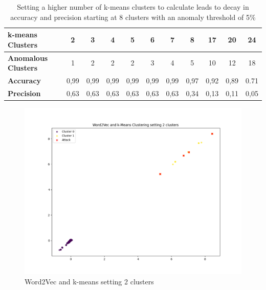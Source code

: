 \begin{table}[H]
	\caption{Setting a higher number of k-means clusters to calculate leads to decay in accuracy and precision starting at 8 clusters with an anomaly threshold of 5\%}
	\label{tab:k-means_clusters}
	\begin{tabular}{|l|c|c|c|c|c|c|c|c|c|c|}
	\hline
	\textbf{k-means Clusters}   & \textbf{2} & \textbf{3} & \textbf{4} & \textbf{5} & \textbf{6} & \textbf{7} & \textbf{8} & \textbf{17} & \textbf{20} & \textbf{24} \\ \hline
	\textbf{Anomalous Clusters} & 1          & 2          & 2          & 2          & 3          & 4          & 5          & 10          & 12          & 18          \\ \hline
	\textbf{Accuracy}           & 0,99       & 0,99       & 0,99       & 0,99       & 0,99       & 0,99       & 0,97       & 0,92        & 0,89        & 0.71        \\ \hline
	\textbf{Precision}          & 0,63       & 0,63       & 0,63       & 0,63       & 0,63       & 0,63       & 0,34       & 0,13        & 0,11        & 0,05        \\ \hline
	\end{tabular}
\end{table}

\begin{figure}[H]
	\caption{Word2Vec and k-means setting 2 clusters}
	\label{fig:kmeans_clusters_2}
	\sffamily\footnotesize
	\includegraphics[width=1\textwidth]{pic/k_means_2.png}
	\unitlength=0.75mm
	\linethickness{0.4pt}
\end{figure}

